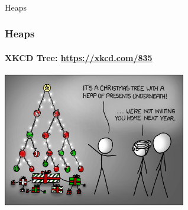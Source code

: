 \begin{frame}[fragile]\frametitle{}
\begin{center}
{\Large Heaps}
\end{center}

\end{frame}


\begin{frame}
	\frametitle{Heaps}
	\framesubtitle{XKCD Tree: \url{https://xkcd.com/835}}
	\begin{center}
		\includegraphics[width=0.6\textwidth]{images/tree.png}\\
	\end{center}
\end{frame}

